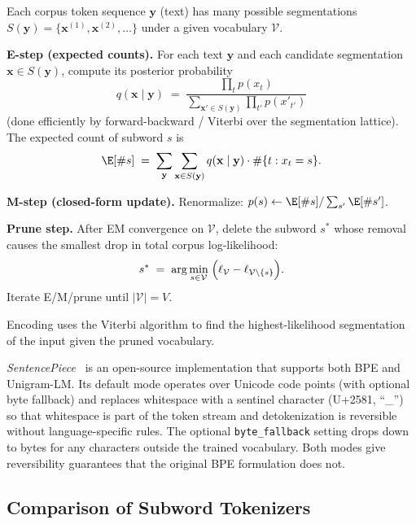 \begin{derivation}
Each corpus token sequence $\mathbf{y}$ (text) has many possible
segmentations $S(\mathbf{y}) = \{\mathbf{x}^{(1)}, \mathbf{x}^{(2)},
\dots\}$ under a given vocabulary $\mathcal{V}$.

\textbf{E-step (expected counts).} For each text $\mathbf{y}$ and
each candidate segmentation $\mathbf{x} \in S(\mathbf{y})$, compute
its posterior probability
\[
  q(\mathbf{x} \mid \mathbf{y}) \;=\;
  \frac{\prod_t p(x_t)}{\sum_{\mathbf{x}' \in S(\mathbf{y})}
    \prod_{t'} p(x'_{t'})}
\]
(done efficiently by forward-backward / Viterbi over the
segmentation lattice). The expected count of subword $s$ is
\[
  \E[\#s] \;=\; \sum_{\mathbf{y}} \sum_{\mathbf{x} \in S(\mathbf{y})}
    q(\mathbf{x}\mid\mathbf{y}) \cdot \#\{t : x_t = s\}.
\]

\textbf{M-step (closed-form update).} Renormalize:
$p(s) \leftarrow \E[\#s] / \sum_{s'} \E[\#s']$.

\textbf{Prune step.} After EM convergence on $\mathcal{V}$, delete
the subword $s^*$ whose removal causes the smallest drop in total
corpus log-likelihood:
\[
  s^* \;=\; \arg\min_{s \in \mathcal{V}}\;
    \Bigl(\ell_{\mathcal{V}} - \ell_{\mathcal{V}\setminus\{s\}}\Bigr).
\]
Iterate E/M/prune until $|\mathcal{V}| = V$.
\end{derivation}

Encoding uses the Viterbi algorithm to find the highest-likelihood
segmentation of the input given the pruned vocabulary.

\emph{SentencePiece}~\citep{kudo2018sentencepiece} is an open-source
implementation that supports both BPE and Unigram-LM. Its default
mode operates over Unicode code points (with optional byte
fallback) and replaces whitespace with a sentinel character (U+2581,
``\_'') so that whitespace is part of the token stream and
detokenization is reversible without language-specific rules. The
optional \texttt{byte\_fallback} setting drops down to bytes for any
characters outside the trained vocabulary. Both modes give
reversibility guarantees that the original BPE formulation does not.

\subsection{Comparison of Subword Tokenizers}

